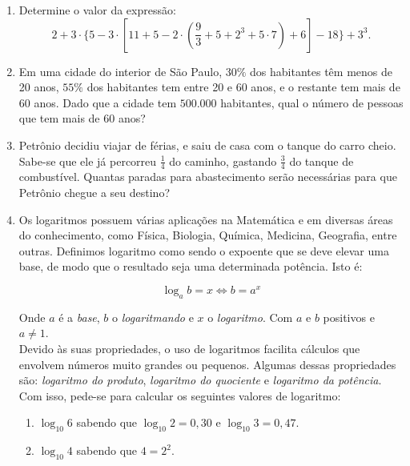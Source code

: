 \documentclass[a4paper, 12pt]{article}
\begin{document}
	
	\begin{enumerate}
	
	\item Determine o valor da expressão:
	$$ 2 + 3 \cdot \{ 5 - 3 \cdot [ 11 + 5 - 2 \cdot ( \frac{9}{3} + 5 + 2^3 + 5 \cdot 7 ) + 6 ] -18 \} + 3^3  .$$
\vspace{0.01cm}

	
	\item Em uma cidade do interior de São Paulo, $30\%$ dos habitantes têm menos de 20 anos, $55\%$ dos habitantes tem entre 20 e 60 anos, e o restante tem mais de 60 anos. Dado que a cidade tem $500.000$ habitantes, qual o número de pessoas que tem mais de 60 anos?
\vspace{1cm}	
	
	
	
	
	\item Petrônio decidiu viajar de férias, e saiu de casa com o tanque do carro cheio. Sabe-se que ele já percorreu $\frac{1}{4}$ do caminho, gastando $\frac{3}{4}$ do tanque de combustível. Quantas paradas para abastecimento serão necessárias para que Petrônio chegue a seu destino?
\vspace{1cm}
	
	
	
	
	\item Os logaritmos possuem várias aplicações na Matemática e em diversas áreas do conhecimento, como Física, Biologia, Química, Medicina, Geografia, entre outras. Definimos logaritmo como sendo o expoente que se deve elevar uma base, de modo que o resultado seja uma determinada potência. Isto é:

			$$ \log_a b = x \Longleftrightarrow b = a^x $$

Onde $a$ é a \textit{base}, $b$ o \textit{logaritmando} e $x$ o \textit{logaritmo}. Com $a$ e $b$ positivos e $a \neq 1$. \\

Devido às suas propriedades, o uso de logaritmos facilita cálculos que envolvem números muito grandes ou pequenos. Algumas dessas propriedades são: \textit{logaritmo do produto}, \textit{logaritmo do quociente} e \textit{logaritmo da potência}. Com isso, pede-se para calcular os seguintes valores de logaritmo:

		\begin{enumerate}
   		 \item $\log_{10}6$ sabendo que $\log_{10} 2 = 0,30$ e $\log_{10} 3 = 0,47$.
    
    		\item $\log_{10}4$ sabendo que $4 = 2^2$.
    

\end{enumerate}
\end{enumerate}
\end{document}
